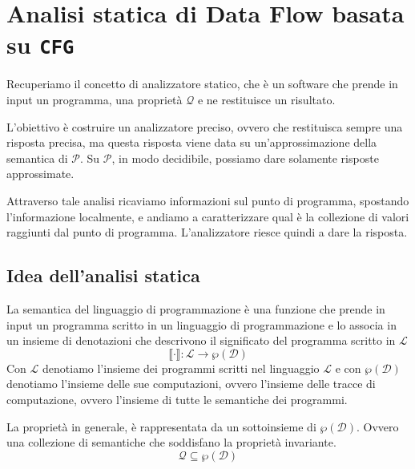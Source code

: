\chapter{Analisi statica di Data Flow basata su \texttt{CFG}}
Recuperiamo il concetto di analizzatore statico, che è un software che prende
in input un programma, una proprietà $\mathcal{Q}$ e ne restituisce un risultato.

\begin{figure}[H]
    \centering
\end{figure}
L'obiettivo è costruire un analizzatore preciso, ovvero che restituisca sempre
una risposta precisa, ma questa risposta viene data su un'approssimazione della semantica di $\mathcal{P}$.
Su $\mathcal{P}$, in modo decidibile, possiamo dare solamente risposte approssimate.

Attraverso tale analisi ricaviamo informazioni sul punto di programma, spostando l'informazione 
localmente, e andiamo a caratterizzare qual è la collezione di valori raggiunti dal punto di programma. 
L'analizzatore riesce quindi a dare la risposta.

\section{Idea dell'analisi statica}
La semantica del linguaggio di programmazione è una funzione che prende in input un programma scritto in un linguaggio
di programmazione e lo associa in un insieme di denotazioni che descrivono il significato del programma
scritto in $\mathcal{L}$
\[
  \llbracket \cdot \rrbracket : \mathcal{L} \rightarrow \wp(\mathcal{D})
\]
Con $\mathcal{L}$ denotiamo l'insieme dei programmi scritti nel linguaggio $\mathcal{L}$ e con 
$\wp(\mathcal{D})$ denotiamo l'insieme delle sue computazioni, ovvero l'insieme delle tracce di computazione,
ovvero l'insieme di tutte le semantiche dei programmi.

La proprietà in generale, è rappresentata da un sottoinsieme di $\wp(\mathcal{D})$. Ovvero una collezione 
di semantiche che soddisfano la proprietà invariante.
\[
    \mathcal{Q} \subseteq \wp(\mathcal{D})
\]

